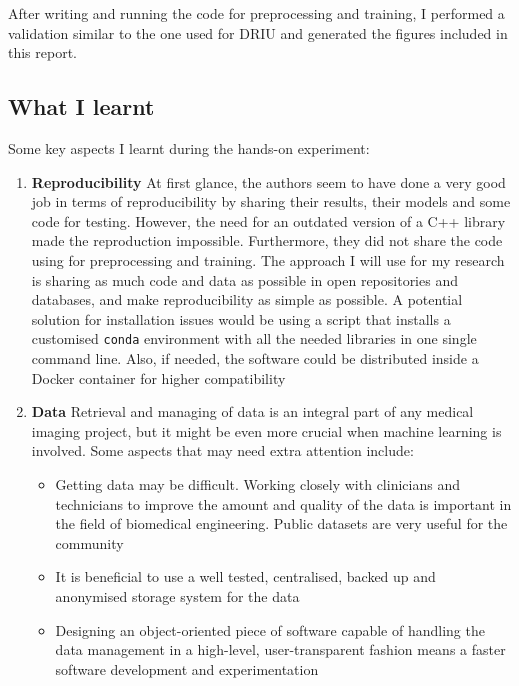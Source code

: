 After writing and running the code for preprocessing and training, I performed a validation similar to the one used for DRIU and generated the figures included in this report.


\subsection{What I learnt}

Some key aspects I learnt during the hands-on experiment:
\begin{enumerate}
  \item \textbf{Reproducibility} At first glance, the authors seem to have done a very good job in terms of reproducibility by sharing their results, their models and some code for testing. However, the need for an outdated version of a C++ library made the reproduction impossible. Furthermore, they did not share the code using for preprocessing and training. The approach I will use for my research is sharing as much code and data as possible in open repositories and databases, and make reproducibility as simple as possible. A potential solution for installation issues would be using a script that installs a customised \texttt{conda} \cite{noauthor_conda_nodate} environment with all the needed libraries in one single command line. Also, if needed, the software could be distributed inside a Docker container \cite{noauthor_docker_nodate} for higher compatibility

  \item \textbf{Data} Retrieval and managing of data is an integral part of any medical imaging project, but it might be even more crucial when machine learning is involved. Some aspects that may need extra attention include:
    \begin{itemize}
      \item Getting data may be difficult. Working closely with clinicians and technicians to improve the amount and quality of the data is important in the field of biomedical engineering. Public datasets are very useful for the community
      \item It is beneficial to use a well tested, centralised, backed up and anonymised storage system for the data
      \item Designing an object-oriented piece of software capable of handling the data management in a high-level, user-transparent fashion means a faster software development and experimentation
    \end{itemize}


\end{enumerate}
